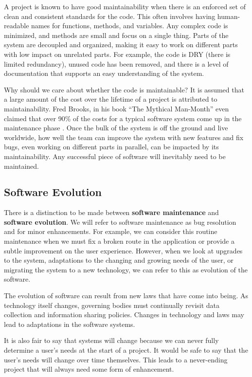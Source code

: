 \documentclass[12pt,conference]{IEEEtran}
\begin{document}
A project is known to have good maintainability when there is an enforced set of clean and consistent standards for the code. This often involves having human-readable names for functions, methods, and variables. Any complex code is minimized, and methods are small and focus on a single thing. Parts of the system are decoupled and organized, making it easy to work on different parts with low impact on unrelated parts. For example, the code is DRY (there is limited redundancy), unused code has been removed, and there is a level of documentation that supports an easy understanding of the system.

Why should we care about whether the code is maintainable? It is assumed that a large amount of the cost over the lifetime of a project is attributed to maintainability. Fred Brooks, in his book ``The Mythical Man-Month'' even claimed that over 90\% of the costs for a typical software system come up in the maintenance phase \cite{brooks:mythical}. Once the bulk of the system is off the ground and live worldwide, how well the team can improve the system with new features and fix bugs, even working on different parts in parallel, can be impacted by its maintainability. Any successful piece of software will inevitably need to be maintained.

\subsection{Software Evolution}

There is a distinction to be made between \textbf{software maintenance} and \textbf{software evolution}. We will refer to software maintenance as bug resolution and for minor enhancements. For example, we can consider this routine maintenance when we must fix a broken route in the application or provide a subtle improvement on the user experience. However, when we look at upgrades to the system, adaptations to the changing and growing needs of the user, or migrating the system to a new technology, we can refer to this as evolution of the software.

The evolution of software can result from new laws that have come into being. As technology itself changes, governing bodies must continually revisit data collection and information sharing policies. Changes in technology and laws may lead to adaptations in the software systems.

It is also fair to say that systems will change because we can never fully determine a user's needs at the start of a project. It would be safe to say that the user's needs will change over time themselves. This leads to a never-ending project that will always need some form of enhancement.
\end{document}
